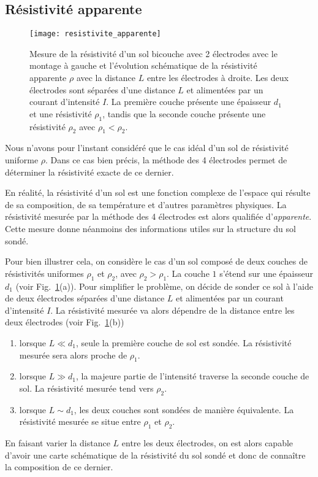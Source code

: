 \subsection{Résistivité apparente}
\begin{figure}[]
	\centering
	\texttt{[image: resistivite\_apparente]}
	\caption{Mesure de la résistivité d'un sol bicouche avec 2 électrodes
		avec le montage à gauche et l'évolution schématique de la résistivité
		apparente $\rho$ avec la distance $L$ entre les électrodes à droite.
		Les deux électrodes sont séparées d'une distance $L$ et 
		alimentées par un courant d'intensité $I$. La première couche 
		présente une épaisseur $d_1$ et une résistivité $\rho_1$, tandis
		que la seconde couche présente une résistivité 
		$\rho_2$ avec $\rho_1 < \rho_2$.}%
	\label{fig:apparente}
\end{figure}
Nous n'avons pour l'instant considéré que le cas idéal d'un sol de résistivité 
uniforme $\rho$. Dans ce cas bien précis, la méthode des 4 électrodes permet de
déterminer la résistivité exacte de ce dernier. 

En réalité, la résistivité d'un sol est une fonction complexe de l'espace qui résulte 
de sa composition, de sa température et d'autres paramètres physiques. 
La résistivité mesurée par la méthode des 4 électrodes est alors
qualifiée d'\emph{apparente}. Cette mesure donne néanmoins des informations utiles
sur la structure du sol sondé.

Pour bien illustrer cela, on considère le cas d'un sol composé de deux couches
de résistivités uniformes $\rho_1$ et $\rho_2$, avec $\rho_2 > \rho_1$. La couche $1$ 
s'étend sur une épaisseur $d_1$ (voir Fig.~\ref{fig:apparente}(a)). 
Pour simplifier le problème,
on décide de sonder ce sol à l'aide de deux électrodes séparées d'une distance $L$
et alimentées par un courant d'intensité $I$. La résistivité mesurée va alors dépendre de
la distance entre les deux électrodes (voir Fig.~\ref{fig:apparente}(b))
\begin{enumerate}
	\item lorsque $L \ll d_1$, seule la première couche de sol est sondée.
	  La résistivité mesurée sera alors proche de $\rho_1$.
	\item lorsque $L \gg d_1$, la majeure partie de l'intensité traverse la seconde
	  couche de sol. La résistivité mesurée tend vers $\rho_2$.
	\item lorsque $L \sim d_1$, les deux couches sont sondées de manière équivalente.
	  La résistivité mesurée se situe entre $\rho_1$ et $\rho_2$.
\end{enumerate}
En faisant varier la distance $L$ entre les deux électrodes, on est alors capable d'avoir
une carte schématique de la résistivité du sol sondé et donc de connaître la 
composition de ce dernier. 
